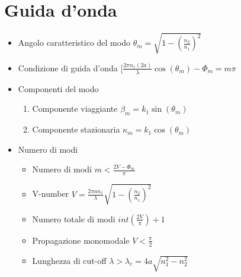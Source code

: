\documentclass{article}
\begin{document}
\section{Guida d'onda}
\begin{itemize}
	\item Angolo caratteristico del modo \( \theta_m = \sqrt{1 - (\frac{n_2}{n_1}) ^ 2} \)
	\item Condizione di guida d'onda \( [\frac{2 \pi n_1 (2 a)}{\lambda} \cos(\theta_m) - \Phi_m = m \pi \)
	\item Componenti del modo
	\begin{enumerate}
		\item Componente viaggiante \( \beta_m = k_1 \sin(\theta_m)\)
		\item Componente stazionaria \( \kappa_m = k_1 \cos(\theta_m) \)
	\end{enumerate}
	\item Numero di modi
	\begin{itemize}
		\item Numero di modi \( m < \frac{2V - \Phi_m}{\pi} \)
		\item V-number \(V = \frac{2 \pi a n_1}{\lambda} \sqrt{1 - (\frac{n_2}{n_1}) ^ 2} \)
		\item Numero totale di modi \( int(\frac{2V}{\pi}) + 1 \)
		\item Propagazione monomodale \( V < \frac{\pi}{2} \)
		\item Lunghezza di cut-off \( \lambda > \lambda_c = 4a \sqrt{n_1^2 - n_2^2} \)
	\end{itemize}
\end{itemize}
\end{document}
